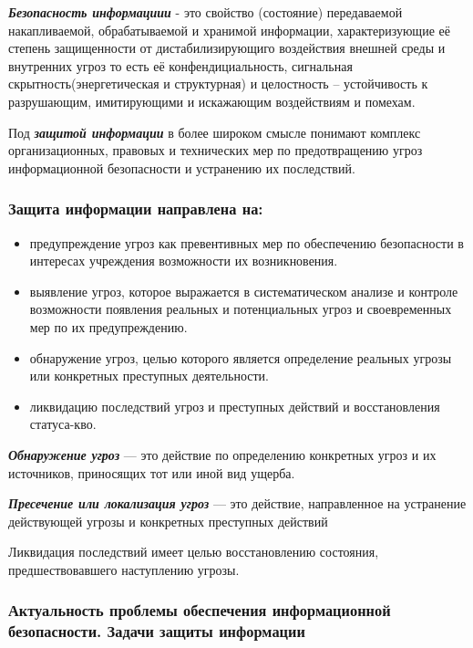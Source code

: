 \documentclass[a4paper,14pt]{extarticle}
\begin{document}
	\textbf{\textit{Безопасность информациии}} - это свойство (состояние) передаваемой накапливаемой, обрабатываемой и хранимой информации, характеризующие её степень защищенности от дистабилизирующиго воздействия внешней среды и внутренних угроз то есть её конфендициальность, сигнальная скрытность(энергетическая и структурная) и целостность -- устойчивость к разрушающим, имитирующими и искажающим воздействиям и помехам.	
	
	Под \textbf{\textit{защитой информации}} в более широком смысле понимают комплекс организационных, правовых и технических мер по предотвращению угроз информационной безопасности и устранению их последствий.
	
	\subsubsection*{Защита информации направлена на:}
	\begin{itemize}
		\item  предупреждение угроз как превентивных мер по обеспечению безопасности в интересах учреждения возможности их возникновения.
		\item  выявление угроз, которое выражается в систематическом анализе и контроле возможности появления реальных и потенциальных угроз и своевременных мер по их предупреждению.
		\item  обнаружение угроз, целью которого является определение реальных угрозы или конкретных преступных деятельности.
		\item  ликвидацию последствий угроз и преступных действий и восстановления статуса-кво.
	\end{itemize}

	\textbf{\textit{Обнаружение угроз}} --- это действие по определению конкретных угроз и их источников, приносящих тот или иной вид ущерба.
	
	\textbf{\textit{Пресечение или локализация угроз}} --- это действие, направленное на устранение действующей угрозы и конкретных преступных действий 
	
	Ликвидация последствий имеет целью восстановлению состояния, предшествовавшего наступлению угрозы.
	\subsubsection{Актуальность проблемы обеспечения информационной безопасности. Задачи защиты информации}
	
\end{document}
